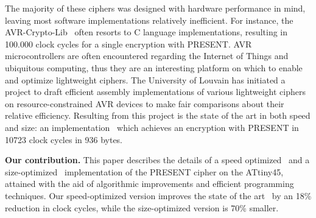\documentclass[11pt]{llncs2e} %
\begin{document}
The majority of these ciphers was designed with hardware performance in mind, leaving most software implementations relatively inefficient. For instance, the AVR-Crypto-Lib~\cite{avr_crypto_lib} often resorts to C language implementations, resulting in 100.000 clock cycles for a single encryption with PRESENT.
AVR microcontrollers are often encountered regarding the Internet of Things and ubiquitous computing, thus they are an interesting platform on which to enable and optimize lightweight ciphers.
The University of Louvain has initiated a project to draft efficient assembly implementations of various lightweight ciphers on resource-constrained AVR devices to make fair comparisons about their relative efficiency.
Resulting from this project is the state of the art in both speed and size: an implementation~\cite{eisenbarth2012compact} which achieves an encryption with PRESENT in 10723 clock cycles in 936 bytes.

\textbf{Our contribution.} This paper describes the details of a speed optimized~\cite{kostas_code} and a size-optimized~\cite{aram_code} implementation of the PRESENT cipher on the ATtiny45, attained with the aid of algorithmic improvements and efficient programming techniques.
Our speed-optimized version improves the state of the art~\cite{eisenbarth2012compact} by an 18\% reduction in clock cycles, while the size-optimized version is 70\% smaller.
\end{document}
